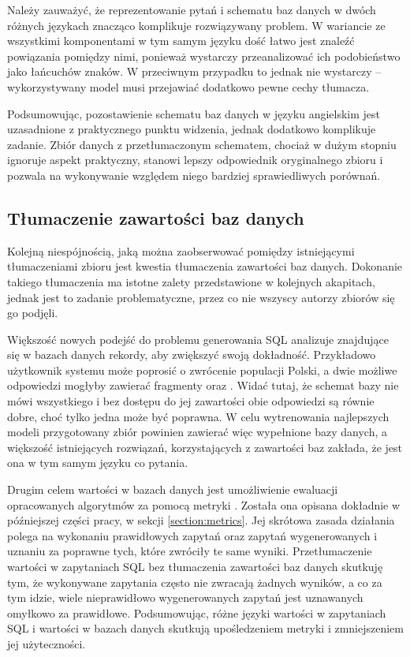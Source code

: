 Należy zauważyć, że reprezentowanie pytań i schematu baz danych w dwóch różnych językach znacząco komplikuje rozwiązywany problem. W wariancie ze wszystkimi komponentami w tym samym języku dość łatwo jest znaleźć powiązania pomiędzy nimi, ponieważ wystarczy przeanalizować ich podobieństwo jako łańcuchów znaków. W przeciwnym przypadku to jednak nie wystarczy -- wykorzystywany model musi przejawiać dodatkowo pewne cechy tłumacza.

Podsumowując, pozostawienie schematu baz danych w języku angielskim jest uzasadnione z praktycznego punktu widzenia, jednak dodatkowo komplikuje zadanie. Zbiór danych z przetłumaczonym schematem, chociaż w dużym stopniu ignoruje aspekt praktyczny, stanowi lepszy odpowiednik oryginalnego zbioru  i pozwala na wykonywanie względem niego bardziej sprawiedliwych porównań.

\subsection{Tłumaczenie zawartości baz danych}
Kolejną niespójnością, jaką można zaobserwować pomiędzy istniejącymi tłumaczeniami zbioru  jest kwestia tłumaczenia zawartości baz danych. Dokonanie takiego tłumaczenia ma istotne zalety przedstawione w kolejnych akapitach, jednak jest to zadanie problematyczne, przez co nie wszyscy autorzy zbiorów się go podjęli.

Większość nowych podejść do problemu generowania SQL analizuje znajdujące się w bazach danych rekordy, aby zwiększyć swoją dokładność. Przykładowo użytkownik systemu może poprosić o zwrócenie populacji Polski, a dwie możliwe odpowiedzi mogłyby zawierać fragmenty  oraz . Widać tutaj, że schemat bazy nie mówi wszystkiego i bez dostępu do jej zawartości obie odpowiedzi są równie dobre, choć tylko jedna może być poprawna. W celu wytrenowania najlepszych modeli przygotowany zbiór powinien zawierać więc wypełnione bazy danych, a większość istniejących rozwiązań, korzystających z zawartości baz zakłada, że jest ona w tym samym języku co pytania.

Drugim celem wartości w bazach danych jest umożliwienie ewaluacji opracowanych algorytmów  za pomocą metryki . Została ona opisana dokładnie w późniejszej części pracy, w sekcji \ref{section:metrics}. Jej skrótowa zasada działania polega na wykonaniu prawidłowych zapytań oraz zapytań wygenerowanych i uznaniu za poprawne tych, które zwróciły te same wyniki. Przetłumaczenie wartości w zapytaniach SQL bez tłumaczenia zawartości baz danych skutkuję tym, że wykonywane zapytania często nie zwracają żadnych wyników, a co za tym idzie, wiele nieprawidłowo wygenerowanych zapytań jest uznawanych omyłkowo za prawidłowe. Podsumowując, różne języki wartości w zapytaniach SQL i wartości w bazach danych skutkują upośledzeniem metryki  i zmniejszeniem jej użyteczności.

